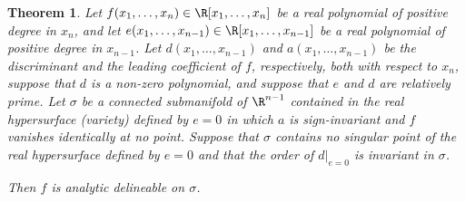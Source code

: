 \documentclass{article}
\newtheorem{theorem}{Theorem}
\begin{document}
\begin{theorem} \label{Variation of lifting theorem}
    Let $f(x_1, \ldots, x_n) \in \R[x_1, \ldots, x_n]$ be a real
    polynomial of positive degree in $x_n$, and let 
    $e(x_1, \ldots, x_{n-1}) \in \R[x_1, \ldots, x_{n-1}]$ be a real 
    polynomial of positive degree in $x_{n-1}$. 
    Let $d(x_1, \ldots, x_{n-1})$ and $a(x_1, \ldots, x_{n-1})$
    be the discriminant and the leading coefficient of $f$,
    respectively, both with respect to $x_n$, 
    suppose that $d$ is a non-zero polynomial, 
    and suppose that $e$ and $d$ are relatively prime.
    Let $\sigma$ be a connected submanifold of $\R^{n-1}$ contained in the
    real hypersurface (variety) defined by $e = 0$ in which 
    $a$ is sign-invariant and $f$ vanishes identically
    at no point. 
    Suppose that $\sigma$ contains no singular point of the real
    hypersurface defined by $e = 0$ and that 
    the order of $d|_{e = 0}$ is invariant
    in $\sigma$. 
    
    Then $f$ is analytic delineable on $\sigma$.
\end{theorem}
\end{document}
